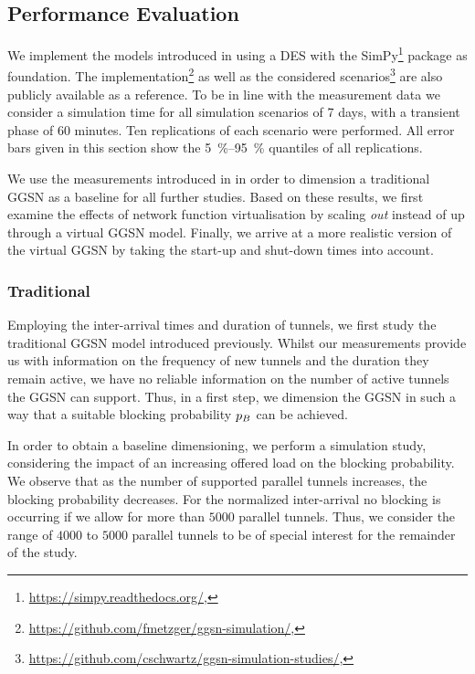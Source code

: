 \subsection{Performance Evaluation}\label{sec:cloud:virtualized_network_functions:performance_evaluation}

We implement the models introduced in  using a \gls{DES} with the SimPy\footnote{\url{https://simpy.readthedocs.org/}, \accessed} package as foundation.
The implementation\footnote{\url{https://github.com/fmetzger/ggsn-simulation/}, \accessed} as well as the considered scenarios\footnote{\url{https://github.com/cschwartz/ggsn-simulation-studies/}, \accessed} are also publicly available as a reference.
To be in line with the measurement data we consider a simulation time for all simulation scenarios of 7 days, with a transient phase of 60 minutes.
Ten replications of each scenario were performed.
All error bars given in this section show the \SIrange{5}{95}{\percent} quantiles of all replications.

We use the measurements introduced in  in order to dimension a traditional \gls{GGSN} as a baseline for all further studies.
Based on these results, we first examine the effects of network function virtualisation by scaling \emph{out} instead of up through a virtual \gls{GGSN} model.
Finally, we arrive at a more realistic version of the virtual \gls{GGSN} by taking the start-up and shut-down times into account.

\subsubsection*{Traditional }\label{sec:cloud:virtualized_network_functions:performance_evaluation:traditional_ggsn}

Employing the inter-arrival times and duration of tunnels, we first study the traditional \gls{GGSN} model introduced previously.
Whilst our measurements provide us with information on the frequency of new tunnels and the duration they remain active, we have no reliable information on the number of active tunnels the \gls{GGSN} can support.
Thus, in a first step, we dimension the \gls{GGSN} in such a way that a suitable blocking probability \(p_B\) can be achieved.


In order to obtain a baseline dimensioning, we perform a simulation study, considering the impact of an increasing offered load on the blocking probability.
We observe that as the number of supported parallel tunnels increases, the blocking probability decreases.
For the normalized inter-arrival no blocking is occurring if we allow for more than \(5000\) parallel tunnels.
Thus, we consider the range of \(4000\) to \(5000\) parallel tunnels to be of special interest for the remainder of the study.


